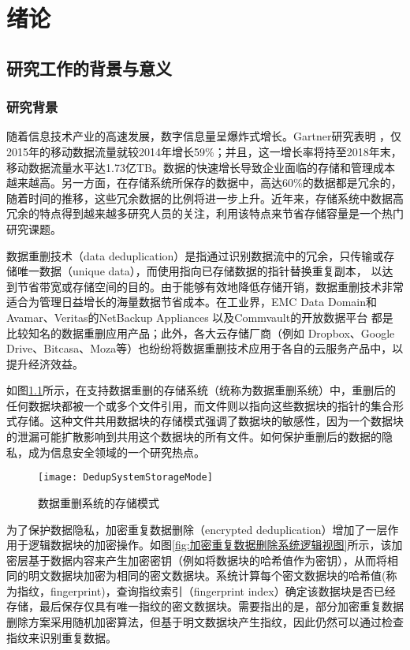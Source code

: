 \chapter{绪\hspace{6pt}论}
\section{研究工作的背景与意义}
\subsection{研究背景}

随着信息技术产业的高速发展，数字信息量呈爆炸式增长。Gartner研究表明 ，仅2015年的移动数据流量就较2014年增长59\%；并且，这一增长率将持至2018年末，移动数据流量水平达1.73亿TB。数据的快速增长导致企业面临的存储和管理成本越来越高。另一方面，在存储系统所保存的数据中，高达60\%的数据都是冗余的，随着时间的推移，这些冗余数据的比例将进一步上升。近年来，存储系统中数据高冗余的特点得到越来越多研究人员的关注，利用该特点来节省存储容量是一个热门研究课题。

数据重删技术（data deduplication）是指通过识别数据流中的冗余，只传输或存储唯一数据（unique data），而使用指向已存储数据的指针替换重复副本， 以达到节省带宽或存储空间的目的。由于能够有效地降低存储开销，数据重删技术非常适合为管理日益增长的海量数据节省成本。在工业界，EMC Data Domain和Avamar、Veritas的NetBackup Appliances 以及Commvault的开放数据平台 都是比较知名的数据重删应用产品；此外，各大云存储厂商（例如 Dropbox、Google Drive、Bitcasa、Moza等）也纷纷将数据重删技术应用于各自的云服务产品中，以提升经济效益。

如图\ref{fig:数据重删系统的存储模式}所示，在支持数据重删的存储系统（统称为数据重删系统）中，重删后的任何数据块都被一个或多个文件引用，而文件则以指向这些数据块的指针的集合形式存储。这种文件共用数据块的存储模式强调了数据块的敏感性，因为一个数据块的泄漏可能扩散影响到共用这个数据块的所有文件。如何保护重删后的数据的隐私，成为信息安全领域的一个研究热点。

\begin{figure}[!htb]
    \small
    \centering
    \texttt{[image: DedupSystemStorageMode]}
    \caption{数据重删系统的存储模式} 
    \label{fig:数据重删系统的存储模式}
\end{figure}

为了保护数据隐私，加密重复数据删除（encrypted deduplication）增加了一层作用于逻辑数据块的加密操作。如图\ref{fig:加密重复数据删除系统逻辑视图}所示，该加密层基于数据内容来产生加密密钥（例如将数据块的哈希值作为密钥），从而将相同的明文数据块加密为相同的密文数据块。系统计算每个密文数据块的哈希值(称为指纹，fingerprint)，查询指纹索引（fingerprint index）确定该数据块是否已经存储，最后保存仅具有唯一指纹的密文数据块。需要指出的是，部分加密重复数据删除方案采用随机加密算法，但基于明文数据块产生指纹，因此仍然可以通过检查指纹来识别重复数据。

